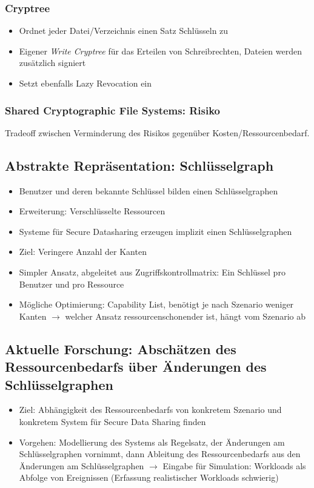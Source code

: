 \subsubsection{Cryptree}
\begin{itemize}
	\item Ordnet jeder Datei/Verzeichnis einen Satz Schlüsseln zu
	\item Eigener \textit{Write Cryptree} für das Erteilen von Schreibrechten, Dateien werden zusätzlich signiert
	\item Setzt ebenfalls Lazy Revocation ein
\end{itemize}

\subsubsection{Shared Cryptographic File Systems: Risiko}
Tradeoff zwischen Verminderung des Risikos gegenüber Kosten/Ressourcenbedarf.


\subsection{Abstrakte Repräsentation: Schlüsselgraph}
\begin{itemize}
	\item Benutzer und deren bekannte Schlüssel bilden einen Schlüsselgraphen
	\item Erweiterung: Verschlüsselte Ressourcen
	\item Systeme für Secure Datasharing erzeugen implizit einen Schlüsselgraphen
	\item Ziel: Veringere Anzahl der Kanten
	\item Simpler Ansatz, abgeleitet aus Zugriffskontrollmatrix: Ein Schlüssel pro Benutzer und pro Ressource
	\item Mögliche Optimierung: Capability List, benötigt je nach Szenario weniger Kanten $\rightarrow$ welcher Ansatz ressourcenschonender ist, hängt vom Szenario ab
\end{itemize}


\subsection{Aktuelle Forschung: Abschätzen des Ressourcenbedarfs über Änderungen des Schlüsselgraphen}
\begin{itemize}
	\item Ziel: Abhängigkeit des Ressourcenbedarfs von konkretem Szenario und konkretem System für Secure Data Sharing finden
	\item Vorgehen: Modellierung des Systems als Regelsatz, der Änderungen am Schlüsselgraphen vornimmt, dann Ableitung des Ressourcenbedarfs aus den Änderungen am Schlüsselgraphen $\rightarrow$ Eingabe für Simulation: Workloads als Abfolge von Ereignissen (Erfassung realistischer Workloads schwierig)
\end{itemize}



